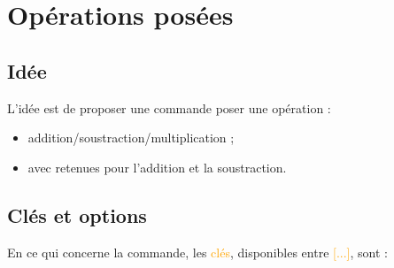 \documentclass[french,a4paper,11pt]{article}
\newcommand\Cle[1]{{\small\sffamily\textlangle \textcolor{orange}{#1}\textrangle}}
\begin{document}
{{\pagebreak

\section{Opérations posées}

\subsection{Idée}

\begin{tipblock}
L'idée est de proposer une commande poser une opération :

\begin{itemize}
	\item addition/soustraction/multiplication ;
	\item avec retenues pour l'addition et la soustraction.
\end{itemize}
\vspace*{-\baselineskip}\leavevmode
\end{tipblock}

\begin{DemoCode}
\end{DemoCode}

\begin{DemoCode}[]
\end{DemoCode}

\begin{DemoCode}[]
\end{DemoCode}

\begin{DemoCode}[]
\end{DemoCode}

\subsection{Clés et options}

\begin{cautionblock}
En ce qui concerne la commande, les \Cle{clés}, disponibles entre \Cle{[...]}, sont :


\end{cautionblock}}}
\end{document}
